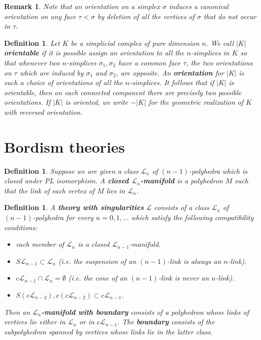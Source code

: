 \documentclass{scrreprt}
\newtheorem{definition}[prop]{Definition}
\newtheorem{remark}[prop]{Remark}
\begin{document}
\begin{remark}
Note that an orientation on a simplex $\sigma$ induces a canonical orientation on any face $\tau < \sigma$ by deletion of all the vertices of $\sigma$ that do not occur in $\tau$.
\end{remark}

\begin{definition}
Let $K$ be a simplicial complex of pure dimension $n$. We call $|K|$ \textbf{orientable} if it is possible assign an orientation to all the $n$-simplices in $K$ so that whenever two $n$-simplices $\sigma_1, \sigma_2$ have a common face $\tau$, the two orientations on $\tau$ which are induced by $\sigma_1$ and $\sigma_2$, are opposite. An \textbf{orientation} for $|K|$ is such a choice of orientations of all the $n$-simplices. It follows that if $|K|$ is orientable, then on each connected component there are precisely two possible orientations. If $|K|$ is oriented, we write $-|K|$ for the geometric realization of $K$ with reversed orientation.
\end{definition}

\section{Bordism theories}

\begin{definition}
Suppose we are given a class $\mathcal{L}_n$ of $(n-1)$-polyhedra which is closed under PL isomorphism. A \textbf{closed $\mathcal{L}_n$-manifold} is a polyhedron $M$ such that the link of each vertex of $M$ lies in $\mathcal{L}_n$. 
\end{definition}

\begin{definition}\label{theory}
A \textbf{theory with singularities} $\mathcal{L}$ consists of a class $\mathcal{L}_n$ of $(n-1)$-polyhedra for every $n=0,1,...$ which satisfy the following compatibility conditions:
\begin{itemize}
\item[1.] each member of $\mathcal{L}_n$ is a closed $\mathcal{L}_{n-1}$-manifold.
\item[2.] $S \mathcal{L}_{n-1} \subset \mathcal{L}_n$ (i.e. the suspension of an $(n-1)$-link is always an $n$-link).
\item[3.] $c \mathcal{L}_{n-1} \cap \mathcal{L}_n = \emptyset$ (i.e. the cone of an $(n-1)$-link is never an $n$-link).
\item[4.] $S(c\mathcal{L}_{n-2}), c(c \mathcal{L}_{n-2}) \subset c \mathcal{L}_{n-1}$.
\end{itemize}
Then an \textbf{$\mathcal{L}_n$-manifold with boundary} consists of a polyhedron whose links of vertices lie either in $\mathcal{L}_n$ or in $c \mathcal{L}_{n-1}$. The \textbf{boundary} consists of the subpolyhedron spanned by vertices whose links lie in the latter class.
\end{definition}
\end{document}
